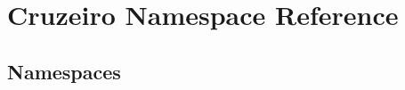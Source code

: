 \hypertarget{namespace_cruzeiro}{}\section{Cruzeiro Namespace Reference}
\label{namespace_cruzeiro}
\subsection*{Namespaces}
\begin{DoxyCompactItemize}
\end{DoxyCompactItemize}
